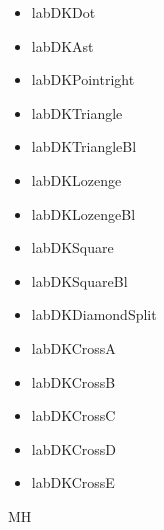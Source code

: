 \documentclass[a4paper]{article}%
\begin{document}
\begin{itemize}[labDKDot]
\item%
    labDKDot
\end{itemize}
\begin{itemize}[labDKAst]
\item%
    labDKAst
\end{itemize}
\begin{itemize}[labDKPointright]
\item%
    labDKPointright
\end{itemize}
\begin{itemize}[labDKTriangle]
\item%
    labDKTriangle
\end{itemize}
\begin{itemize}[labDKTriangleBl]
\item%
    labDKTriangleBl
\end{itemize}
\begin{itemize}[labDKLozenge]
\item%
    labDKLozenge
\end{itemize}
\begin{itemize}[labDKLozengeBl]
\item%
    labDKLozengeBl
\end{itemize}
\begin{itemize}[labDKSquare]
\item%
    labDKSquare
\end{itemize}
\begin{itemize}[labDKSquareBl]
\item%
    labDKSquareBl
\end{itemize}
\begin{itemize}[labDKDiamondSplit]
\item%
    labDKDiamondSplit
\end{itemize}
\begin{itemize}[labDKCrossA]
\item%
    labDKCrossA
\end{itemize}
\begin{itemize}[labDKCrossB]
\item%
    labDKCrossB
\end{itemize}
\begin{itemize}[labDKCrossC]
\item%
    labDKCrossC
\end{itemize}
\begin{itemize}[labDKCrossD]
\item%
    labDKCrossD
\end{itemize}
\begin{itemize}[labDKCrossE]
\item%
    labDKCrossE
\end{itemize}
MH
\end{document}
